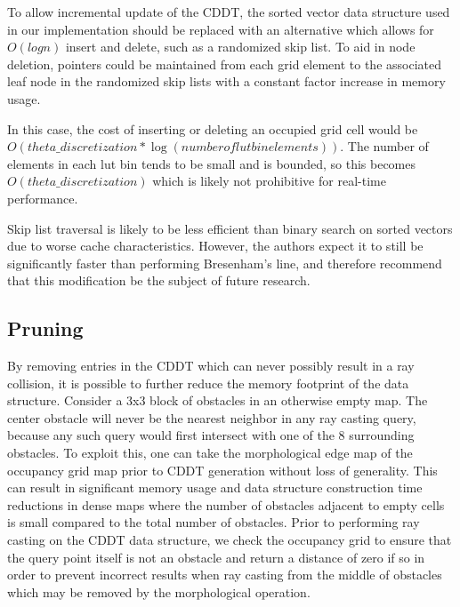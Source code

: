 \documentclass[letterpaper, 10 pt, conference]{ieeeconf}  %
\begin{document}
To allow incremental update of the CDDT, the sorted vector data structure used in our implementation should be replaced with an alternative which allows for $O(logn)$ insert and delete, such as a randomized skip list. To aid in node deletion, pointers could be maintained from each grid element to the associated leaf node in the randomized skip lists with a constant factor increase in memory usage. 

In this case, the cost of inserting or deleting an occupied grid cell would be $O(theta\_discretization*\log(number of lut bin elements))$. The number of elements in each lut bin tends to be small and is bounded, so this becomes $O(theta\_discretization)$ which is likely not prohibitive for real-time performance.

Skip list traversal is likely to be less efficient than binary search on sorted vectors due to worse cache characteristics. However, the authors expect it to still be significantly faster than performing Bresenham’s line, and therefore recommend that this modification be the subject of future research.

\subsection{Pruning}

By removing entries in the CDDT which can never possibly result in a ray collision, it is possible to further reduce the memory footprint of the data structure. Consider a 3x3 block of obstacles in an otherwise empty map. The center obstacle will never be the nearest neighbor in any ray casting query, because any such query would first intersect with one of the 8 surrounding obstacles. To exploit this, one can take the morphological edge map of the occupancy grid map prior to CDDT generation without loss of generality. This can result in significant memory usage and data structure construction time reductions in dense maps where the number of obstacles adjacent to empty cells is small compared to the total number of obstacles. Prior to performing ray casting on the CDDT data structure, we check the occupancy grid to ensure that the query point itself is not an obstacle and return a distance of zero if so in order to prevent incorrect results when ray casting from the middle of obstacles which may be removed by the morphological operation.
\end{document}
